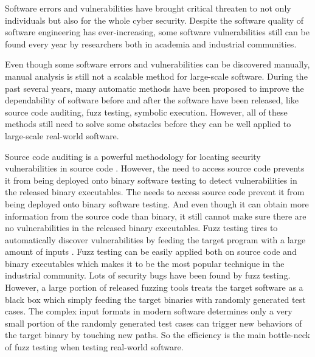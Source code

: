Software errors and vulnerabilities have brought critical threaten to not only individuals but also for the whole cyber security. Despite the software quality of software engineering has ever-increasing, some software vulnerabilities still can be found every year by researchers both in academia and industrial communities. 

Even though some software errors and vulnerabilities can be discovered manually, manual analysis is still not a scalable method for large-scale software. During the past several years, many automatic methods have been proposed to improve the dependability of software before and after the software have been released, like source code auditing, fuzz testing, symbolic execution. However, all of these methods still need to solve some obstacles before they can be well applied to large-scale real-world software.

Source code auditing is a powerful methodology for locating security vulnerabilities in source code \cite{Kuperman:Detection, Lee:audit, schmeelk2012standardizing}. However, the need to access source code prevents it from being deployed onto binary software testing to detect vulnerabilities in the released binary executables. The needs to access source code prevent it from being deployed onto binary software testing. And even though it can obtain more information from the source code than binary, it still cannot make sure there are no vulnerabilities in the released binary executables.
Fuzz testing tires to automatically discover vulnerabilities by feeding the target program with a large amount of inputs \cite{Miller:Fuzz}. Fuzz testing can be easily applied both on source code and binary executables which makes it to be the most popular technique in the industrial community. Lots of security bugs have been found by fuzz testing. However, a large portion of released fuzzing tools treats the target software as a black box which simply feeding the target binaries with randomly generated test cases. The complex input formats in modern software determines only a very small portion of the randomly generated test cases can trigger new behaviors of the target binary by touching new paths. So the efficiency is the main bottle-neck of fuzz testing when testing real-world software.

